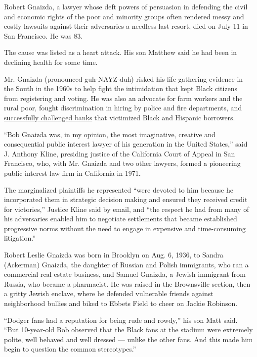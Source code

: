 Robert Gnaizda, a lawyer whose deft powers of persuasion in defending
the civil and economic rights of the poor and minority groups often
rendered messy and costly lawsuits against their adversaries a needless
last resort, died on July 11 in San Francisco. He was 83.

The cause was listed as a heart attack. His son Matthew said he had been
in declining health for some time.

Mr. Gnaizda (pronounced guh-NAYZ-duh) risked his life gathering evidence
in the South in the 1960s to help fight the intimidation that kept Black
citizens from registering and voting. He was also an advocate for farm
workers and the rural poor, fought discrimination in hiring by police
and fire departments, and
\href{https://www.nytimes.com/2011/04/14/business/14prosecute.html}{successfully
challenged banks} that victimized Black and Hispanic borrowers.

``Bob Gnaizda was, in my opinion, the most imaginative, creative and
consequential public interest lawyer of his generation in the United
States,'' said J. Anthony Kline, presiding justice of the California
Court of Appeal in San Francisco, who, with Mr. Gnaizda and two other
lawyers, formed a pioneering public interest law firm in California in
1971.

The marginalized plaintiffs he represented ``were devoted to him because
he incorporated them in strategic decision making and ensured they
received credit for victories,'' Justice Kline said by email, and ``the
respect he had from many of his adversaries enabled him to negotiate
settlements that became established progressive norms without the need
to engage in expensive and time-consuming litigation.''

Robert Leslie Gnaizda was born in Brooklyn on Aug. 6, 1936, to Sandra
(Ackerman) Gnaizda, the daughter of Russian and Polish immigrants, who
ran a commercial real estate business, and Samuel Gnaizda, a Jewish
immigrant from Russia, who became a pharmacist. He was raised in the
Brownsville section, then a gritty Jewish enclave, where he defended
vulnerable friends against neighborhood bullies and biked to Ebbets
Field to cheer on Jackie Robinson.

``Dodger fans had a reputation for being rude and rowdy,'' his son Matt
said. ``But 10-year-old Bob observed that the Black fans at the stadium
were extremely polite, well behaved and well dressed --- unlike the
other fans. And this made him begin to question the common
stereotypes.''

